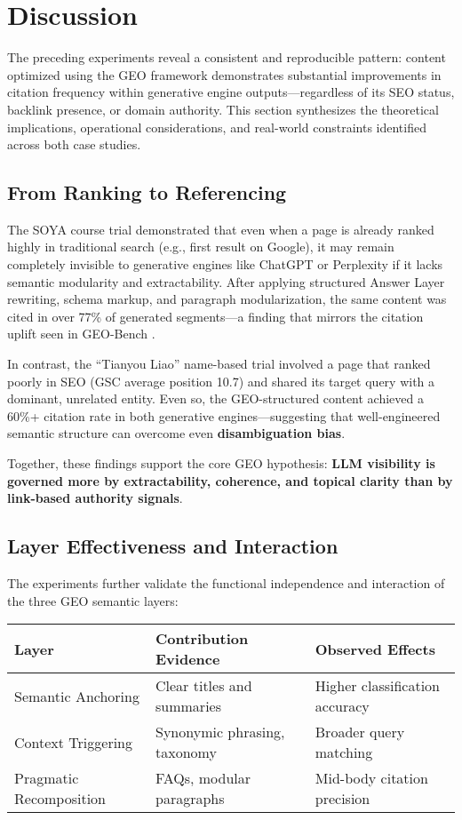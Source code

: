 \section{Discussion}

The preceding experiments reveal a consistent and reproducible pattern: content optimized using the GEO framework demonstrates substantial improvements in citation frequency within generative engine outputs---regardless of its SEO status, backlink presence, or domain authority. This section synthesizes the theoretical implications, operational considerations, and real-world constraints identified across both case studies.

\subsection{From Ranking to Referencing}

The SOYA course trial demonstrated that even when a page is already ranked highly in traditional search (e.g., first result on Google), it may remain completely invisible to generative engines like ChatGPT or Perplexity if it lacks semantic modularity and extractability. After applying structured Answer Layer rewriting, schema markup, and paragraph modularization, the same content was cited in over 77\% of generated segments---a finding that mirrors the citation uplift seen in GEO-Bench \cite{aggarwal2024geo}.

In contrast, the “Tianyou Liao” name-based trial involved a page that ranked poorly in SEO (GSC average position 10.7) and shared its target query with a dominant, unrelated entity. Even so, the GEO-structured content achieved a 60\%+ citation rate in both generative engines---suggesting that well-engineered semantic structure can overcome even \textbf{disambiguation bias}.

Together, these findings support the core GEO hypothesis: \textbf{LLM visibility is governed more by extractability, coherence, and topical clarity than by link-based authority signals}.

\subsection{Layer Effectiveness and Interaction}

The experiments further validate the functional independence and interaction of the three GEO semantic layers:

\begin{center}
\begin{tabular}{|l|l|l|}
\hline
\textbf{Layer} & \textbf{Contribution Evidence} & \textbf{Observed Effects} \\\hline
Semantic Anchoring & Clear titles and summaries & Higher classification accuracy \\\hline
Context Triggering & Synonymic phrasing, taxonomy & Broader query matching \\\hline
Pragmatic Recomposition & FAQs, modular paragraphs & Mid-body citation precision \\\hline
\end{tabular}
\end{center}

